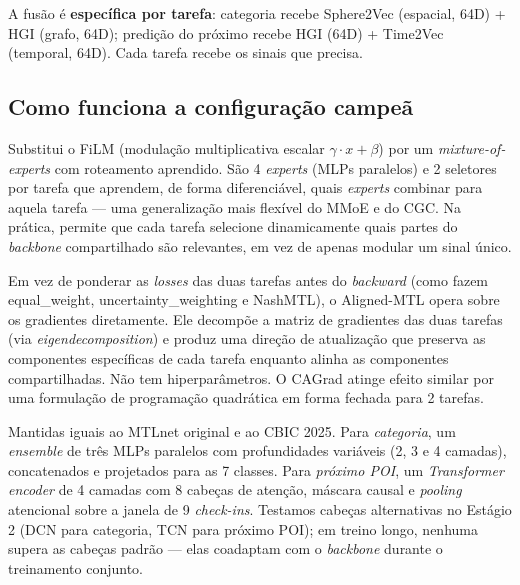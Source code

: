 \documentclass[12pt,a4paper]{article}
\begin{document}
A fusão é \textbf{específica por tarefa}: categoria recebe Sphere2Vec (espacial, 64D) + HGI (grafo, 64D); predição do próximo recebe HGI (64D) + Time2Vec (temporal, 64D). Cada tarefa recebe os sinais que precisa.

\subsection*{Como funciona a configuração campeã}

\begin{description}[leftmargin=1em,style=nextline]

\item[DSelectK (arquitetura).] Substitui o FiLM (modulação multiplicativa escalar $\gamma \cdot x + \beta$) por um \textit{mixture-of-experts} com roteamento aprendido. São 4 \textit{experts} (MLPs paralelos) e 2 seletores por tarefa que aprendem, de forma diferenciável, quais \textit{experts} combinar para aquela tarefa --- uma generalização mais flexível do MMoE e do CGC. Na prática, permite que cada tarefa selecione dinamicamente quais partes do \textit{backbone} compartilhado são relevantes, em vez de apenas modular um sinal único.

\item[Aligned-MTL (otimizador).] Em vez de ponderar as \textit{losses} das duas tarefas antes do \textit{backward} (como fazem equal\_weight, uncertainty\_weighting e NashMTL), o Aligned-MTL opera sobre os gradientes diretamente. Ele decompõe a matriz de gradientes das duas tarefas (via \textit{eigendecomposition}) e produz uma direção de atualização que preserva as componentes específicas de cada tarefa enquanto alinha as componentes compartilhadas. Não tem hiperparâmetros. O CAGrad atinge efeito similar por uma formulação de programação quadrática em forma fechada para 2 tarefas.

\item[Cabeças padrão.] Mantidas iguais ao MTLnet original e ao CBIC 2025. Para \textit{categoria}, um \textit{ensemble} de três MLPs paralelos com profundidades variáveis (2, 3 e 4 camadas), concatenados e projetados para as 7 classes. Para \textit{próximo POI}, um \textit{Transformer encoder} de 4 camadas com 8 cabeças de atenção, máscara causal e \textit{pooling} atencional sobre a janela de 9 \textit{check-ins}. Testamos cabeças alternativas no Estágio 2 (DCN para categoria, TCN para próximo POI); em treino longo, nenhuma supera as cabeças padrão --- elas coadaptam com o \textit{backbone} durante o treinamento conjunto.

\end{description}
\end{document}
